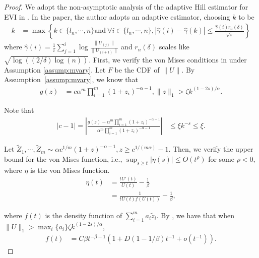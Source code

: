 \documentclass[12pt]{article}
\theoremstyle{plain}
\theoremstyle{definition}
\begin{document}
\begin{proof}
  We adopt the non-asymptotic analysis of the adaptive Hill estimator for EVI
  in {\citep{boucheron2015tail}}. In the paper, the author adopts an adaptive
  estimator, choosing $k$ to be
  \begin{align*}
    k & = \max \left\{ k \in \{l_n, \cdots, n\} \text{and} \  \forall i \in
    \{l_n, \cdots, n\}, | \hat{\gamma}(i) - \hat{\gamma}(k) | \leqslant
    \frac{\hat{\gamma}(i) r_n (\delta)}{\sqrt{i}} \right\}
  \end{align*}
  where $\hat{\gamma}(i) = \frac{1}{i} \sum_{j=1}^i \log \frac{\|U_{(j)}\|}{\|U_{(i+1)}\|}$ and $r_n (\delta)$ scales like $\sqrt{\log ((2 / \delta) \log (n))}$.
  First, we verify the von Mises conditions in \cite{boucheron2015tail} under Assumption \ref{assump:mvary}. Let $F$ be the CDF of $\|U\|$. By
  Assumption~\ref{assump:mvary}, we know that
  \begin{align*}
    g (z) & = c \alpha^m  \prod_{i = 1}^m (1 + z_i)^{- \alpha - 1}, \|z\|_1 >
    \zeta k^{(1 - 2 s) / \alpha} .
  \end{align*}
  
  Note that
  \begin{align*}
    |c - 1| = \left| \frac{g (z) - \alpha^m  \prod_{i = 1}^m (1 + z_i)^{-
    \alpha - 1}}{\alpha^m  \prod_{i = 1}^m (1 + z_i)^{- \alpha - 1}} \right| &
    \leqslant \xi k^{- s} \leqslant \xi .
  \end{align*}
  
  Let $\tilde{Z}_1, \cdots, \tilde{Z}_m \sim \alpha c^{1 / m} (1 + z)^{-
  \alpha - 1}, z \geqslant c^{1 / (m \alpha)} - 1$. Then, we verify the upper bound for the von Mises function, i.e., $\sup_{s\geqslant t} |\eta (s)| \leqslant O( t^\rho)$ for some $\rho < 0$, where $\eta$ is the von Mises function.
  \begin{align}
    \eta (t) & = \frac{tU' (t)}{U (t)} - \frac{1}{\beta} \\
    & = \frac{1}{tU (t) f (U (t))} - \frac{1}{\beta},  \label{eq:vonmise_fun}
  \end{align}
  
  where $f (t)$ is the density function of $\sum_{i = 1}^m a_i \tilde{z}_i$. By
  {\citetext{\citealp{nguyen2014tail},  Theorem 2.1}}, we have that when
  $\|U\|_1 > \max_i \{a_i \} \zeta k^{(1 - 2 s) / \alpha}$,
  \begin{align}
    f (t) & = C \beta t^{- \beta - 1} (1 + D (1 - 1 / \beta) t^{- 1} + o (t^{-
    1})) .  \label{eq:density_f}
  \end{align}
  

\end{proof}
\end{document}
